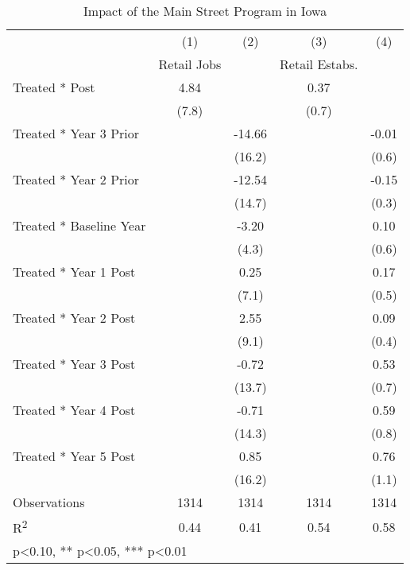 \begin{table}[htbp]\centering
\def\sym#1{\ifmmode^{#1}\else\(^{#1}\)\fi}
\caption{Impact of the Main Street Program in Iowa}
\begin{tabular}{l*{4}{c}}
\toprule
            &\multicolumn{1}{c}{(1)}   &\multicolumn{1}{c}{(2)}   &\multicolumn{1}{c}{(3)}   &\multicolumn{1}{c}{(4)}   \\
            & Retail Jobs   &               &Retail Estabs.   &               \\
\midrule
Treated * Post&        4.84   &               &        0.37   &               \\
            &       (7.8)   &               &       (0.7)   &               \\
Treated * Year 3 Prior&               &      -14.66   &               &       -0.01   \\
            &               &      (16.2)   &               &       (0.6)   \\
Treated * Year 2 Prior&               &      -12.54   &               &       -0.15   \\
            &               &      (14.7)   &               &       (0.3)   \\
Treated * Baseline Year&               &       -3.20   &               &        0.10   \\
            &               &       (4.3)   &               &       (0.6)   \\
Treated * Year 1 Post&               &        0.25   &               &        0.17   \\
            &               &       (7.1)   &               &       (0.5)   \\
Treated * Year 2 Post&               &        2.55   &               &        0.09   \\
            &               &       (9.1)   &               &       (0.4)   \\
Treated * Year 3 Post&               &       -0.72   &               &        0.53   \\
            &               &      (13.7)   &               &       (0.7)   \\
Treated * Year 4 Post&               &       -0.71   &               &        0.59   \\
            &               &      (14.3)   &               &       (0.8)   \\
Treated * Year 5 Post&               &        0.85   &               &        0.76   \\
            &               &      (16.2)   &               &       (1.1)   \\
\midrule
Observations &        1314   &        1314   &        1314   &        1314   \\
R\textsuperscript{2} &        0.44   &        0.41   &        0.54   &        0.58   \\
\bottomrule
\multicolumn{5}{l}{\footnotesize * p<0.10, ** p<0.05, *** p<0.01}\\
\end{tabular}
\end{table}
